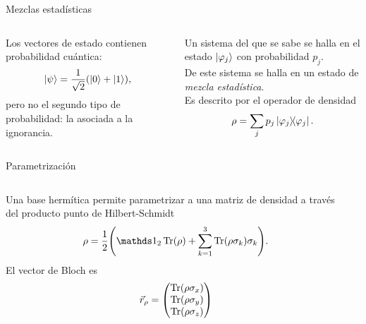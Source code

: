 \begin{frame}{Mezclas estadísticas}
    \begin{columns}
        \begin{column}{0.5\textwidth}
            Los vectores de estado contienen probabilidad cuántica:
            \begin{equation}
                \ket{\psi}=\frac{1}{\sqrt{2}}(\ket{0}+\ket{1}),\nonumber
            \end{equation}
            \pause
            pero no el segundo tipo de probabilidad: la asociada a la ignorancia.
        \end{column}
        \pause
        \begin{column}{0.5\textwidth}
            Un sistema del que se sabe se halla en el estado $\ket{\varphi_{j}}$ con probabilidad $p_{j}$.\\
            \vspace{0.2cm}
            \pause
            De este sistema se halla en un estado de \textit{mezcla estadística}.\\
            \vspace{0.2cm}
            \pause
            Es descrito por el operador de densidad
            \begin{equation}
                \rho=\sum_{j}p_{j}\dyad{\varphi_{j}}.\nonumber
            \end{equation}
        \end{column}
    \end{columns}
\end{frame}

\begin{frame}{Parametrización}
    \begin{columns}
        \begin{column}{0.5\textwidth}
            Una base hermítica permite parametrizar a una matriz de densidad a través del producto punto de Hilbert-Schmidt
            \begin{equation}
                \rho=\frac{1}{2}\qty(\Id_{2}\Tr(\rho)+\sum_{k=1}^{3}\Tr(\rho\pauli{k})\pauli{k}).\nonumber
            \end{equation}
            \pause
            El vector de Bloch es
            \begin{equation}
                \vec{r}_{\rho}=\begin{pmatrix}
                    \Tr(\rho\sigma_{x})\\
                    \Tr(\rho\sigma_{y})\\
                    \Tr(\rho\sigma_{z})
                \end{pmatrix}\nonumber
            \end{equation}
        \end{column}
        \pause
        \begin{column}{0.5\textwidth}
            \centering
            \BlochSphereDensity
        \end{column}
    \end{columns}
\end{frame}


